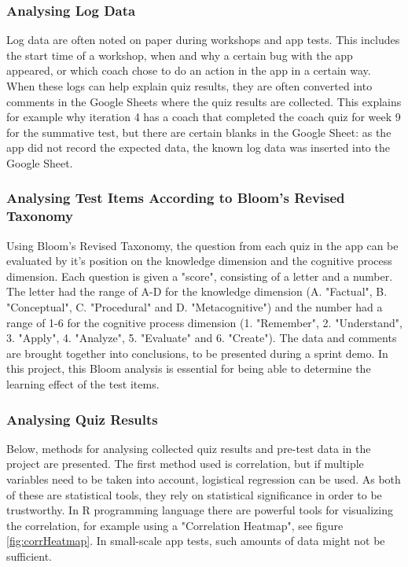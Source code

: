 \subsubsection{Analysing Log Data}
Log data are often noted on paper during workshops and app tests. This includes the start time of a workshop, when and why a certain bug with the app appeared, or which coach chose to do an action in the app in a certain way. When these logs can help explain quiz results, they are often converted into comments in the Google Sheets where the quiz results are collected. This explains for example why iteration 4 has a coach that completed the coach quiz for week 9 for the summative test, but there are certain blanks in the Google Sheet: as the app did not record the expected data, the known log data was inserted into the Google Sheet.

\subsubsection{Analysing Test Items According to Bloom's Revised Taxonomy}
Using Bloom's Revised Taxonomy, the question from each quiz in the app can be evaluated by it's position on the knowledge dimension and the cognitive process dimension. Each question is given a "score", consisting of a letter and a number. The letter had the range of A-D for the knowledge dimension (A. "Factual", B. "Conceptual", C. "Procedural" and D. "Metacognitive") and the number had a range of 1-6 for the cognitive process dimension (1. "Remember", 2. "Understand", 3. "Apply", 4. "Analyze", 5. "Evaluate" and 6. "Create"). The data and comments are brought together into conclusions, to be presented during a sprint demo. In this project, this Bloom analysis is essential for being able to determine the learning effect of the test items.

\subsubsection{Analysing Quiz Results}
Below, methods for analysing collected quiz results and pre-test data in the project are presented. The first method used is correlation, but if multiple variables need to be taken into account, logistical regression can be used. As both of these are statistical tools, they rely on statistical significance in order to be trustworthy. In R programming language there are powerful tools for visualizing the correlation, for example using a "Correlation Heatmap", see figure \ref{fig:corrHeatmap}. In small-scale app tests, such amounts of data might not be sufficient.

